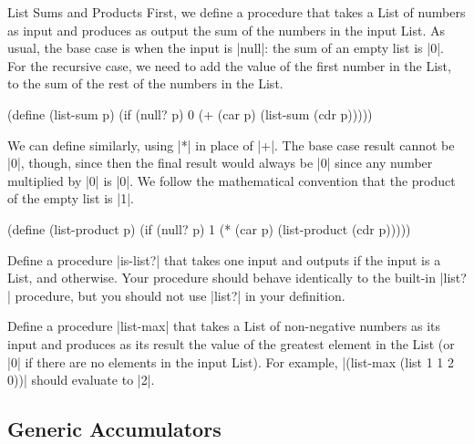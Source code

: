 \begin{schemeregion}
\begin{examplenobar}{List Sums and Products}\label{example:list-sum} First, we define a procedure that takes a List of numbers as input and produces as output the sum of the numbers in the input List.  As usual, the base case is when the input is \scheme|null|: the sum of an empty list is \scheme|0|.  For the recursive case, we need to add the value of the first number in the List, to the sum of the rest of the numbers in the List.  
\begin{schemedisplay}
(define (list-sum p)
   (if (null? p) 0 (+ (car p) (list-sum (cdr p)))))
\end{schemedisplay}
We can define  similarly, using \scheme|*| in place of \scheme|+|.  The base case result cannot be \scheme|0|, though, since then the final result would always be \schemeresult|0| since any number multiplied by \scheme|0| is \scheme|0|.  We follow the mathematical convention that the product of the empty list is \scheme|1|.
\begin{schemedisplay}
(define (list-product p)
   (if (null? p) 1 (* (car p) (list-product (cdr p)))))
\end{schemedisplay}
\end{examplenobar}

\beforeex
\begin{exercise}\label{ex:listq} \bluestar
Define a procedure \scheme|is-list?| that takes one input and outputs  if the input is a List, and  otherwise.  Your procedure should behave identically to the built-in \scheme|list?| procedure, but you should not use \scheme|list?| in your definition.  %
\solution{\LATER{}}
\end{exercise}
\afterex

\beforeex
\begin{exercise}\label{ex:list-max} \greenstar
Define a procedure \scheme|list-max| that takes a List of non-negative numbers as its input and produces as its result the value of the greatest element in the List (or \schemeresult|0| if there are no elements in the input List).  For example, \scheme|(list-max (list 1 1 2 0))| should evaluate to \schemeresult|2|.
\solution{\LATER{}}
\end{exercise}
\afterex

\subsection{Generic Accumulators}\label{sec:generic}


\end{schemeregion}
